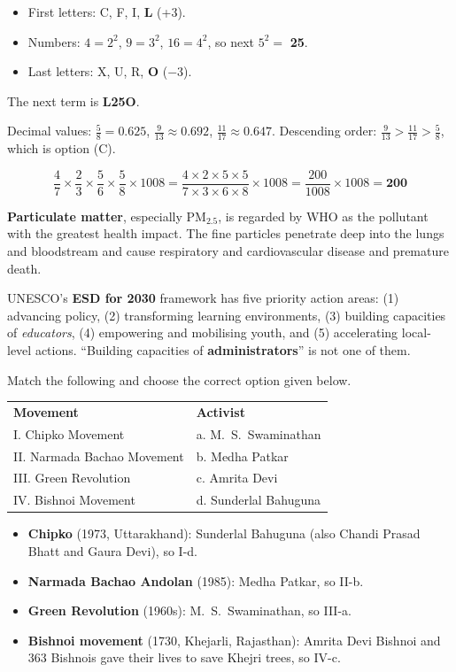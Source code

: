 \begin{itemize}
\item First letters: C, F, I, \textbf{L} (+3).
\item Numbers: $4=2^2$, $9=3^2$, $16=4^2$, so next $5^2=$ \textbf{25}.
\item Last letters: X, U, R, \textbf{O} ($-3$).
\end{itemize}
The next term is \textbf{L25O}.

Decimal values: $\tfrac58=0.625$, $\tfrac{9}{13}\approx0.692$, $\tfrac{11}{17}\approx0.647$.
Descending order: $\tfrac{9}{13}>\tfrac{11}{17}>\tfrac58$, which is option (C).

\[\frac47\times\frac23\times\frac56\times\frac58\times1008=\frac{4\times2\times5\times5}{7\times3\times6\times8}\times1008=\frac{200}{1008}\times1008=\mathbf{200}\]

\textbf{Particulate matter}, especially PM$_{2.5}$, is regarded by WHO as the pollutant with the greatest health impact. The fine particles penetrate deep into the lungs and bloodstream and cause respiratory and cardiovascular disease and premature death.

UNESCO's \textbf{ESD for 2030} framework has five priority action areas: (1) advancing policy, (2) transforming learning environments, (3) building capacities of \emph{educators}, (4) empowering and mobilising youth, and (5) accelerating local-level actions. ``Building capacities of \textbf{administrators}'' is not one of them.

Match the following and choose the correct option given below.\\[2pt]
\begin{tabular}{@{}ll@{}}
\textbf{Movement} & \textbf{Activist}\\
I. Chipko Movement & a. M.~S.~Swaminathan\\
II. Narmada Bachao Movement & b. Medha Patkar\\
III. Green Revolution & c. Amrita Devi\\
IV. Bishnoi Movement & d. Sunderlal Bahuguna\\
\end{tabular}

\begin{itemize}
\item \textbf{Chipko} (1973, Uttarakhand): Sunderlal Bahuguna (also Chandi Prasad Bhatt and Gaura Devi), so I-d.
\item \textbf{Narmada Bachao Andolan} (1985): Medha Patkar, so II-b.
\item \textbf{Green Revolution} (1960s): M.~S.~Swaminathan, so III-a.
\item \textbf{Bishnoi movement} (1730, Khejarli, Rajasthan): Amrita Devi Bishnoi and 363 Bishnois gave their lives to save Khejri trees, so IV-c.
\end{itemize}

